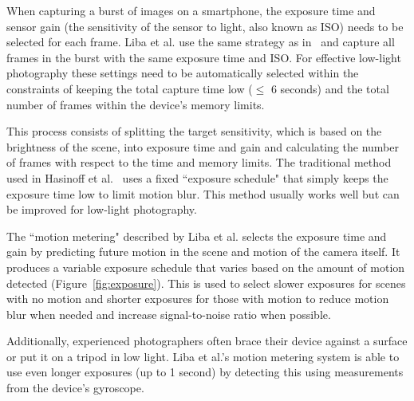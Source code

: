 \documentclass{sig-alternate}
\begin{document}
When capturing a burst of images on a smartphone, the exposure time and sensor gain (the sensitivity of the sensor to light, also known as ISO) needs to be selected for each frame. Liba et al. use the same strategy as in~\cite{Hasinoff2016} and capture all frames in the burst with the same exposure time and ISO. For effective low-light photography these settings need to be automatically selected within the constraints of keeping the total capture time low ($\leq$ 6 seconds) and the total number of frames within the device's memory limits.

This process consists of splitting the target sensitivity, which is based on the brightness of the scene, into exposure time and gain and calculating the number of frames with respect to the time and memory limits. The traditional method used in Hasinoff et al.~\cite{Hasinoff2016} uses a fixed ``exposure schedule" that simply keeps the exposure time low to limit motion blur. This method usually works well but can be improved for low-light photography.

The ``motion metering" described by Liba et al. selects the exposure time and gain by predicting future motion in the scene and motion of the camera itself. It produces a variable exposure schedule that varies based on the amount of motion detected (Figure~\ref{fig:exposure}). This is used to select slower exposures for scenes with no motion and shorter exposures for those with motion to reduce motion blur when needed and increase signal-to-noise ratio when possible.

Additionally, experienced photographers often brace their device against a surface or put it on a tripod in low light. Liba et al.'s motion metering system is able to use even longer exposures (up to 1 second) by detecting this using measurements from the device's gyroscope.





\end{document}
